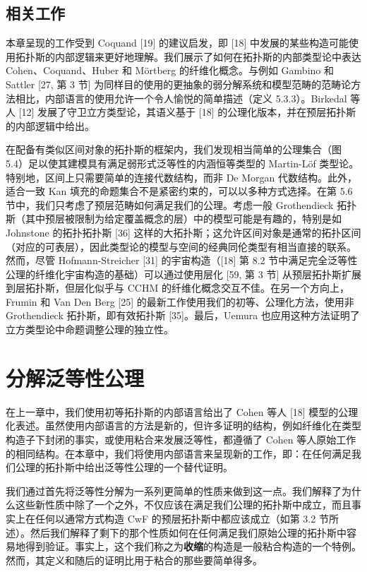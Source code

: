 \documentclass{ctexrep}
\theoremstyle{plain}
\theoremstyle{definition}
\theoremstyle{remark}
\begin{document}
\section{相关工作}

本章呈现的工作受到 Coquand [19] 的建议启发，即 [18] 中发展的某些构造可能使用拓扑斯的内部逻辑来更好地理解。我们展示了如何在拓扑斯的内部类型论中表达 Cohen、Coquand、Huber 和 Mörtberg 的纤维化概念。与例如 Gambino 和 Sattler [27, 第 3 节] 为同样目的使用的更抽象的弱分解系统和模型范畴的范畴论方法相比，内部语言的使用允许一个令人愉悦的简单描述（定义 5.3.3）。Birkedal 等人 [12] 发展了守卫立方类型论，其语义基于 [18] 的公理化版本，并在预层拓扑斯的内部逻辑中给出。

在配备有类似区间对象的拓扑斯的框架内，我们发现相当简单的公理集合（图 5.4）足以使其建模具有满足弱形式泛等性的内涵恒等类型的 Martin-Löf 类型论。特别地，区间上只需要简单的连接代数结构，而非 De Morgan 代数结构。此外，适合一致 Kan 填充的命题集合不是紧密约束的，可以以多种方式选择。在第 5.6 节中，我们只考虑了预层范畴如何满足我们的公理。考虑一般 Grothendieck 拓扑斯（其中预层被限制为给定覆盖概念的层）中的模型可能是有趣的，特别是如 Johnstone 的拓扑拓扑斯 [36] 这样的大拓扑斯；这允许区间对象是通常的拓扑区间（对应的可表层），因此类型论的模型与空间的经典同伦类型有相当直接的联系。然而，尽管 Hofmann-Streicher [31] 的宇宙构造（[18] 第 8.2 节中满足完全泛等性公理的纤维化宇宙构造的基础）可以通过使用层化 [59, 第 3 节] 从预层拓扑斯扩展到层拓扑斯，但层化似乎与 CCHM 的纤维化概念交互不佳。在另一个方向上，Frumin 和 Van Den Berg [25] 的最新工作使用我们的初等、公理化方法，使用非 Grothendieck 拓扑斯，即有效拓扑斯 [35]。最后，Uemura 也应用这种方法证明了立方类型论中命题调整公理的独立性。

\chapter{分解泛等性公理}

在上一章中，我们使用初等拓扑斯的内部语言给出了 Cohen 等人 [18] 模型的公理化表述。虽然使用内部语言的方法是新的，但许多证明的结构，例如纤维化在类型构造子下封闭的事实，或使用粘合来发展泛等性，都遵循了 Cohen 等人原始工作的相同结构。在本章中，我们将使用内部语言来呈现新的工作，即：在任何满足我们公理的拓扑斯中给出泛等性公理的一个替代证明。

我们通过首先将泛等性分解为一系列更简单的性质来做到这一点。我们解释了为什么这些新性质中除了一个之外，不仅应该在满足我们公理的拓扑斯中成立，而且事实上在任何以通常方式构造 CwF 的预层拓扑斯中都应该成立（如第 3.2 节所述）。然后我们解释了剩下的那个性质如何在任何满足我们原始公理的拓扑斯中容易地得到验证。事实上，这个我们称之为\textbf{收缩}的构造是一般粘合构造的一个特例。然而，其定义和随后的证明比用于粘合的那些要简单得多。
\end{document}
